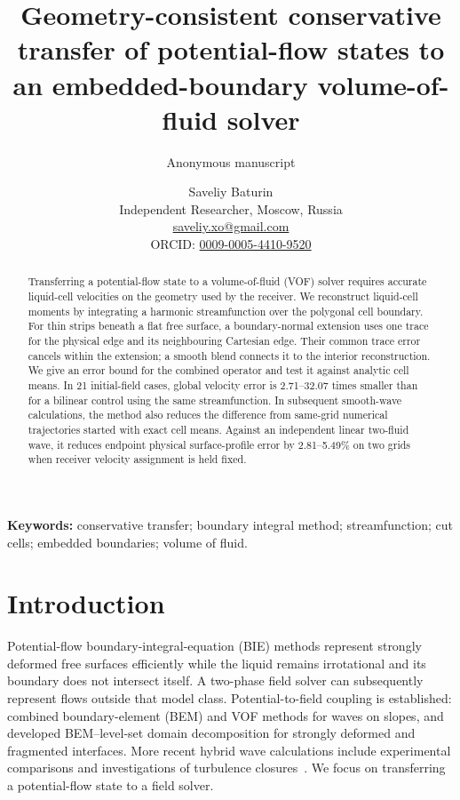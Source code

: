 \documentclass[10pt]{article}
\title{\fontsize{16}{20}\selectfont\bfseries
Geometry-consistent conservative transfer of potential-flow states
to an embedded-boundary volume-of-fluid solver}
\author{Anonymous manuscript}
\author{Saveliy Baturin\\\small Independent Researcher, Moscow, Russia\\
\small\href{mailto:saveliy.xo@gmail.com}{saveliy.xo@gmail.com}\\
\small ORCID: \href{https://orcid.org/0009-0005-4410-9520}{0009-0005-4410-9520}}
\date{}
\begin{document}
\maketitle

\begin{abstract}
Transferring a potential-flow state to a volume-of-fluid (VOF) solver
requires accurate liquid-cell velocities on the geometry used by the
receiver. We reconstruct liquid-cell moments by integrating a harmonic
streamfunction over the polygonal cell boundary. For thin strips beneath a
flat free surface, a boundary-normal extension uses one trace for the
physical edge and its neighbouring Cartesian edge. Their common trace
error cancels within the extension; a smooth blend connects it to the
interior reconstruction. We give an error bound for the combined operator
and test it against analytic cell means. In 21
initial-field cases, global velocity error is 2.71--32.07 times smaller
than for a bilinear control using the same streamfunction. In subsequent
smooth-wave calculations, the method also reduces the difference from
same-grid numerical trajectories started with exact cell means. Against an
independent linear two-fluid wave, it reduces endpoint physical
surface-profile error by 2.81--5.49\% on two grids when receiver velocity
assignment is held fixed.
\end{abstract}
\noindent\textbf{Keywords:} conservative transfer; boundary integral method;
streamfunction; cut cells; embedded boundaries; volume of fluid.

\section{Introduction}
Potential-flow boundary-integral-equation (BIE) methods represent strongly deformed free
surfaces efficiently while the liquid remains irrotational and its boundary
does not intersect itself. A two-phase field solver can subsequently represent
flows outside that model class. Potential-to-field coupling is established:
\citet{lachaume} combined boundary-element (BEM) and VOF methods for waves on slopes,
and \citet{colicchio} developed BEM--level-set domain
decomposition for strongly deformed and fragmented interfaces. More recent
hybrid wave calculations include experimental comparisons and investigations
of turbulence closures~\citep{zhang}. We focus on transferring a
potential-flow state to a field solver.
\end{document}
